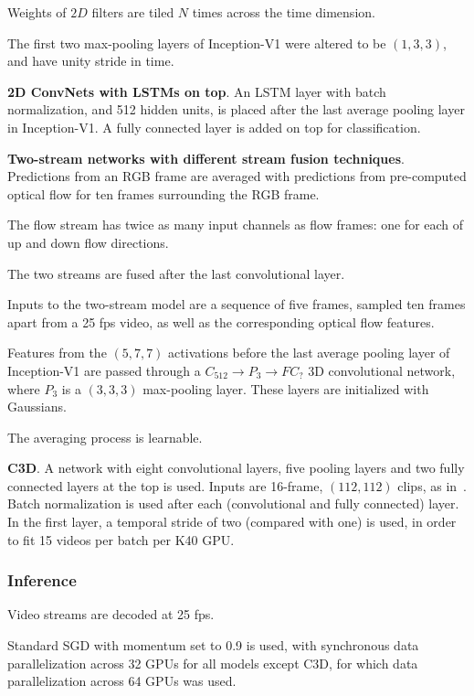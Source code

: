 \documentclass[a4paper, 12pt]{article}
\begin{document}
Weights of $2D$ filters are tiled $N$ times across the time dimension.

The first two max-pooling layers of Inception-V1 were altered to be
$(1, 3, 3)$, and have unity stride in time.

\textbf{2D ConvNets with LSTMs on top}. An LSTM layer with batch normalization,
and 512 hidden units, is placed after the last average pooling layer in
Inception-V1. A fully connected layer is added on top for classification.

\textbf{Two-stream networks with different stream fusion techniques}.
Predictions from an RGB frame are averaged with predictions from pre-computed
optical flow for ten frames surrounding the RGB frame.

The flow stream has twice as many input channels as flow frames: one for each
of up and down flow directions.

The two streams are fused after the last convolutional layer.

Inputs to the two-stream model are a sequence of five frames, sampled ten
frames apart from a 25 fps video, as well as the corresponding optical flow
features.

Features from the $(5, 7, 7)$ activations before the last average pooling layer
of Inception-V1 are passed through a $C_{512} \rightarrow P_3 \rightarrow FC_{?}$ 3D
convolutional network, where $P_3$ is a $(3, 3, 3)$ max-pooling layer. These
layers are initialized with Gaussians.

The averaging process is learnable.

\textbf{C3D}. A network with eight convolutional layers, five pooling layers
and two fully connected layers at the top is used. Inputs are 16-frame,
$(112, 112)$ clips, as in~\citet{DBLP:journals/corr/TranBFTP14}. Batch
normalization is used after each (convolutional and fully connected) layer. In
the first layer, a temporal stride of two (compared with one) is used, in order
to fit 15 videos per batch per K40 GPU\@.

\subsubsection{Inference}

Video streams are decoded at 25 fps.

Standard SGD with momentum set to 0.9 is used, with synchronous data
parallelization across 32 GPUs for all models except C3D, for which data
parallelization across 64 GPUs was used.
\end{document}

